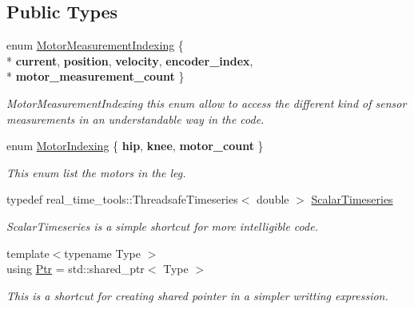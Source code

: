 \subsection*{Public Types}
\begin{DoxyCompactItemize}
\item 
enum \hyperlink{classblmc__drivers_1_1LegInterface_a9335cf8bf2595f70716159927d927346}{Motor\+Measurement\+Indexing} \{ \\*
{\bfseries current}, 
{\bfseries position}, 
{\bfseries velocity}, 
{\bfseries encoder\+\_\+index}, 
\\*
{\bfseries motor\+\_\+measurement\+\_\+count}
 \}\hypertarget{classblmc__drivers_1_1LegInterface_a9335cf8bf2595f70716159927d927346}{}\label{classblmc__drivers_1_1LegInterface_a9335cf8bf2595f70716159927d927346}
\begin{DoxyCompactList}\small\item\em Motor\+Measurement\+Indexing this enum allow to access the different kind of sensor measurements in an understandable way in the code. \end{DoxyCompactList}
\item 
enum \hyperlink{classblmc__drivers_1_1LegInterface_a2a11567617debfdb731ac06e2938712c}{Motor\+Indexing} \{ {\bfseries hip}, 
{\bfseries knee}, 
{\bfseries motor\+\_\+count}
 \}\hypertarget{classblmc__drivers_1_1LegInterface_a2a11567617debfdb731ac06e2938712c}{}\label{classblmc__drivers_1_1LegInterface_a2a11567617debfdb731ac06e2938712c}
\begin{DoxyCompactList}\small\item\em This enum list the motors in the leg. \end{DoxyCompactList}
\item 
typedef real\+\_\+time\+\_\+tools\+::\+Threadsafe\+Timeseries$<$ double $>$ \hyperlink{classblmc__drivers_1_1LegInterface_a57a35b64a76fb4225637828d1b1c35a6}{Scalar\+Timeseries}\hypertarget{classblmc__drivers_1_1LegInterface_a57a35b64a76fb4225637828d1b1c35a6}{}\label{classblmc__drivers_1_1LegInterface_a57a35b64a76fb4225637828d1b1c35a6}

\begin{DoxyCompactList}\small\item\em Scalar\+Timeseries is a simple shortcut for more intelligible code. \end{DoxyCompactList}\item 
{\footnotesize template$<$typename Type $>$ }\\using \hyperlink{classblmc__drivers_1_1LegInterface_ac5af9e6514abff5ee918813925a8e42d}{Ptr} = std\+::shared\+\_\+ptr$<$ Type $>$
\begin{DoxyCompactList}\small\item\em This is a shortcut for creating shared pointer in a simpler writting expression. \end{DoxyCompactList}\end{DoxyCompactItemize}
